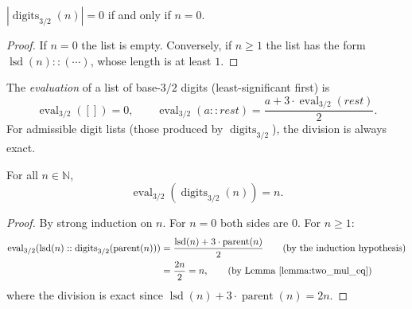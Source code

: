 \begin{lemma}\label{lemma:digits32_length_eq_zero_iff}\leanok
$|\operatorname{digits}_{3/2}(n)| = 0$ if and only if $n = 0$.
\end{lemma}
\begin{proof}\leanok
If $n = 0$ the list is empty.  Conversely, if $n \ge 1$ the list has the
form $\operatorname{lsd}(n) :: (\cdots)$, whose length is at least $1$.
\end{proof}


\begin{definition}\label{def:eval32}\leanok
The \emph{evaluation} of a list of base-$3/2$ digits (least-significant first) is
\[
  \operatorname{eval}_{3/2}([]) = 0, \qquad
  \operatorname{eval}_{3/2}(a :: \mathit{rest}) = \frac{a + 3 \cdot \operatorname{eval}_{3/2}(\mathit{rest})}{2}.
\]
For admissible digit lists (those produced by $\operatorname{digits}_{3/2}$), the
division is always exact.
\end{definition}

\begin{lemma}\label{lemma:eval32_digits32}\leanok
For all $n \in \mathbb{N}$,
\[
  \operatorname{eval}_{3/2}(\operatorname{digits}_{3/2}(n)) = n.
\]
\end{lemma}
\begin{proof}\leanok
By strong induction on $n$.  For $n = 0$ both sides are $0$.  For $n \ge 1$:
\begin{align*}
  \operatorname{eval}_{3/2}(\operatorname{lsd}(n) :: \operatorname{digits}_{3/2}(\operatorname{parent}(n)))
  &= \frac{\operatorname{lsd}(n) + 3 \cdot \operatorname{parent}(n)}{2}
    \tag{by the induction hypothesis} \\
  &= \frac{2n}{2} = n,
    \tag{by Lemma~\ref{lemma:two_mul_eq}}
\end{align*}
where the division is exact since $\operatorname{lsd}(n) + 3 \cdot \operatorname{parent}(n) = 2n$.
\end{proof}



